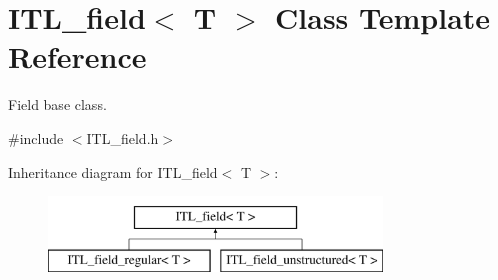 \hypertarget{classITL__field}{
\section{ITL\_\-field$<$ T $>$ Class Template Reference}
\label{classITL__field}
}


Field base class.  




{\ttfamily \#include $<$ITL\_\-field.h$>$}

Inheritance diagram for ITL\_\-field$<$ T $>$:\begin{figure}[H]
\begin{center}
\leavevmode
\includegraphics[height=2cm]{classITL__field}
\end{center}
\end{figure}
